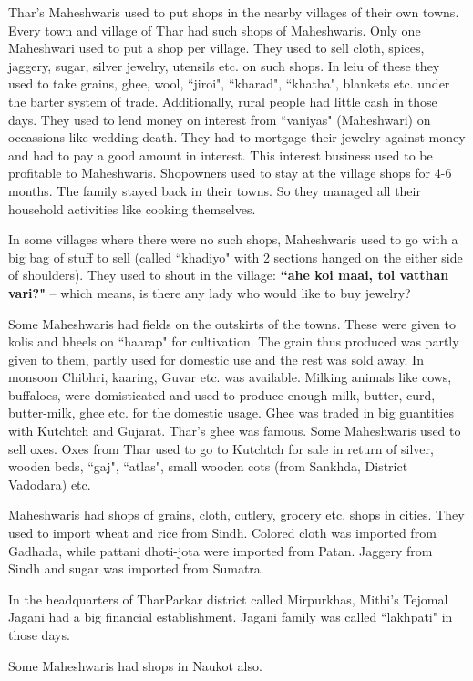 Thar's Maheshwaris used to put shops in the nearby villages of their own towns.
Every town and village of Thar had such shops of Maheshwaris. Only one
Maheshwari used to put a shop per village. They used to sell cloth, spices,
jaggery, sugar, silver jewelry, utensils etc. on such shops. In leiu of these
they used to take grains, ghee, wool, ``jiroi", ``kharad", ``khatha", blankets
etc. under the barter system of trade. Additionally, rural people had little
cash in those days. They used to lend money on interest from ``vaniyas"
(Maheshwari) on occassions like wedding-death. They had to mortgage their
jewelry against money and had to pay a good amount in interest. This interest
business used to be profitable to Maheshwaris. Shopowners used to stay at the
village shops for 4-6 months. The family stayed back in their towns. So they
managed all their household activities like cooking themselves.

In some villages where there were no such shops, Maheshwaris used to go with a
big bag of stuff to sell (called ``khadiyo" with 2 sections hanged on the either
side of shoulders). They used to shout in the village: \textbf{``ahe koi maai,
tol vatthan vari?"} -- which means, is there any lady who would like to buy
jewelry?

Some Maheshwaris had fields on the outskirts of the towns. These were given to
kolis and bheels on ``haarap" for cultivation. The grain thus produced was
partly given to them, partly used for domestic use and the rest was sold away.
In monsoon Chibhri, kaaring, Guvar etc. was available. Milking animals like
cows, buffaloes, were domisticated and used to produce enough milk, butter,
curd, butter-milk, ghee etc. for the domestic usage. Ghee was traded in big
guantities with Kutchtch and Gujarat. Thar's ghee was famous. Some Maheshwaris
used to sell oxes. Oxes from Thar used to go to Kutchtch for sale in return of
silver, wooden beds, ``gaj", ``atlas", small wooden cots (from Sankhda, District
Vadodara) etc.

Maheshwaris had shops of grains, cloth, cutlery, grocery etc. shops in cities.
They used to import wheat and rice from Sindh. Colored cloth was imported from
Gadhada, while pattani dhoti-jota were imported from Patan. Jaggery from Sindh
and sugar was imported from Sumatra.

In the headquarters of TharParkar district called Mirpurkhas, Mithi's Tejomal
Jagani had a big financial establishment. Jagani family was called ``lakhpati"
in those days.

Some Maheshwaris had shops in Naukot also.

